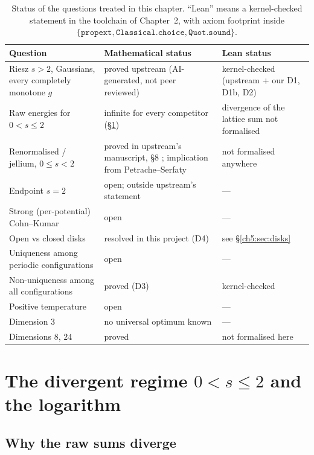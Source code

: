 \begin{table}[ht]
\centering\small
\caption{Status of the questions treated in this chapter. ``Lean'' means a kernel-checked statement in the
toolchain of Chapter~2, with axiom footprint inside $\{\texttt{propext},\texttt{Classical.choice},\texttt{Quot.sound}\}$.}
\label{ch5:tab:open-status}
\begin{tabular}{@{}p{4.6cm}p{4.4cm}p{4.6cm}@{}}
\toprule
Question & Mathematical status & Lean status\\
\midrule
Riesz $s>2$, Gaussians, every completely monotone $g$ & proved upstream \cite{oai} (AI-generated, not peer reviewed) & kernel-checked (upstream + our D1, D1b, D2)\\
Raw energies for $0<s\le2$ & infinite for every competitor (\S\ref{ch5:sec:div}) & divergence of the lattice sum not formalised\\
Renormalised / jellium, $0\le s<2$ & proved in upstream's manuscript, \S8 \cite{oai}; implication from Petrache--Serfaty \cite{ps} & not formalised anywhere\\
Endpoint $s=2$ & open; outside upstream's statement & ---\\
Strong (per-potential) Cohn--Kumar & open & ---\\
Open vs closed disks & resolved in this project (D4) & see \S\ref{ch5:sec:disks}\\
Uniqueness among periodic configurations & open & ---\\
Non-uniqueness among all configurations & proved (D3) & kernel-checked\\
Positive temperature & open & ---\\
Dimension $3$ & no universal optimum known & ---\\
Dimensions $8$, $24$ & proved \cite{ckmrv} & not formalised here\\
\bottomrule
\end{tabular}
\end{table}

\section{The divergent regime \texorpdfstring{$0<s\le2$}{0<s<=2} and the logarithm}
\label{ch5:sec:div}

\subsection{Why the raw sums diverge}


